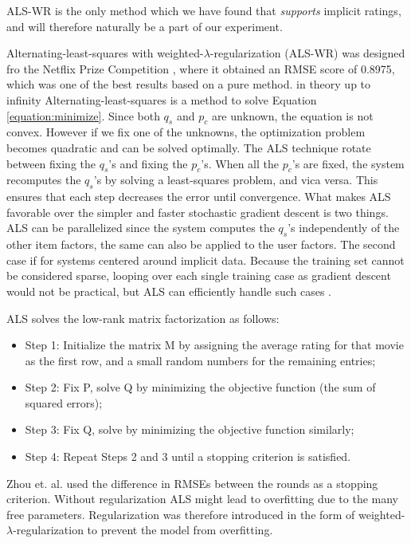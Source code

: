 ALS-WR is the only method which we have found that \emph{supports} implicit ratings, and will therefore naturally be a part of our experiment.

Alternating-least-squares with weighted-$\lambda$-regularization (ALS-WR) was designed fro the Netflix Prize Competition \cite{Netflix}, where it obtained an RMSE score of 0.8975, which was one of the best results based on a pure method.
in theory up to infinity
Alternating-least-squares is a method to solve Equation \ref{equation:minimize}. Since both $q_{s}$ and $p_{c}$ are unknown, the equation is not convex. However if we fix one of the unknowns, the optimization problem becomes quadratic and can be solved optimally. The ALS technique rotate between fixing the $q_{s}$'s and fixing the $p_{c}$'s. When all the $p_{c}$'s are fixed, the system recomputes the $q_{s}$'s by solving a least-squares problem, and vica versa. This ensures that each step decreases the error until convergence. What makes ALS favorable over the simpler and faster stochastic gradient descent is two things. ALS can be parallelized since the system computes the $q_{s}$'s independently of the other item factors, the same can also be applied to the user factors. The second case if for systems centered around implicit data. Because the training set cannot be considered sparse, looping over each single training case as gradient descent would not be practical, but ALS can efficiently handle such cases \cite{Hu2008}.\newline

ALS solves the low-rank matrix factorization as follows:

\begin{itemize}
\item Step 1: Initialize the matrix M by assigning the average rating for that movie as the first row, and a small random numbers for the remaining entries;
\item Step 2: Fix P, solve Q by minimizing the objective function (the sum of squared errors);
\item Step 3: Fix Q, solve by minimizing the objective function similarly;
\item Step 4: Repeat Steps 2 and 3 until a stopping criterion is satisfied.
\end{itemize}

Zhou et. al. \cite{Zhou2008} used the difference in RMSEs between the rounds as a stopping criterion. Without regularization ALS might lead to overfitting due to the many free parameters. Regularization was therefore introduced in the form of weighted-$\lambda$-regularization to prevent the model from overfitting.

